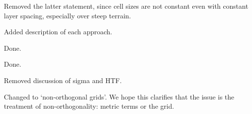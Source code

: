 \documentclass{article}
\begin{document}
\begin{quotation}
\begin{comment}
\item Line 58/59: conflicting information: you highlight the variable spacing and then the fact that cell sizes remain almost constant
\end{comment}
\end{quotation}
Removed the latter statement, since cell sizes are not constant even with constant layer spacing, especially over steep terrain.

\begin{quotation}
\begin{comment}
\item Line 67: provide some brief information about the `several approaches'.  A since sentence does not justify a paragraph.
\end{comment}
\end{quotation}
Added description of each approach.

\begin{quotation}
\begin{comment}
\item Line 80: add `\ldots artificially weak in the Eta model'.
\end{comment}
\end{quotation}
Done.

\begin{quotation}
\begin{comment}
\item Line 102: be more explicit: `\ldots of the Cartesian coordinate surface at the model level with transformed height $z^\star$'.  Spell out explicitly that $z$ varies between $h$ and $H$ and that $z^\star$ varies between 0 and $H$.
\end{comment}
\end{quotation}
Done.

\begin{quotation}
\begin{comment}
\item Line 106--111: This manuscript does not discuss or use pressure-based vertical coordinates at all, and the information about sigma and HTF is irrelevant.  Furthermore, the sigma definition is only correct for models with zero pressure at the model top.  Remove these lines.
\end{comment}
\end{quotation}
Removed discussion of sigma and HTF.

\begin{quotation}
\begin{comment}
\item Line 124: It is not clear what you mean by `unstructured grids'.  The grids seem to be very structured.  Clarify.
\end{comment}
\end{quotation}
Changed to `non-orthogonal grids'.  We hope this clarifies that the issue is the treatment of non-orthogonality: metric terms or the grid.
\end{document}

